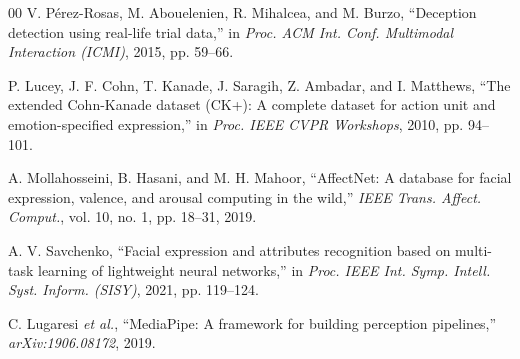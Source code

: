 \documentclass[conference]{IEEEtran}
\begin{document}
\begin{thebibliography}{00}
V. P\'erez-Rosas, M. Abouelenien, R. Mihalcea, and M. Burzo, ``Deception detection using real-life trial data,'' in \textit{Proc. ACM Int. Conf. Multimodal Interaction (ICMI)}, 2015, pp. 59--66.

P. Lucey, J. F. Cohn, T. Kanade, J. Saragih, Z. Ambadar, and I. Matthews, ``The extended Cohn-Kanade dataset (CK+): A complete dataset for action unit and emotion-specified expression,'' in \textit{Proc. IEEE CVPR Workshops}, 2010, pp. 94--101.

A. Mollahosseini, B. Hasani, and M. H. Mahoor, ``AffectNet: A database for facial expression, valence, and arousal computing in the wild,'' \textit{IEEE Trans. Affect. Comput.}, vol. 10, no. 1, pp. 18--31, 2019.

A. V. Savchenko, ``Facial expression and attributes recognition based on multi-task learning of lightweight neural networks,'' in \textit{Proc. IEEE Int. Symp. Intell. Syst. Inform. (SISY)}, 2021, pp. 119--124.

C. Lugaresi \textit{et al.}, ``MediaPipe: A framework for building perception pipelines,'' \textit{arXiv:1906.08172}, 2019.
\end{thebibliography}
\end{document}
